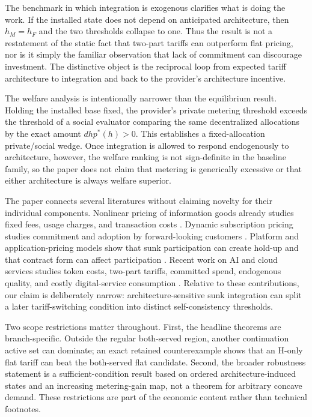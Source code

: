 The benchmark in which integration is exogenous clarifies what is doing the work. If the installed state does not depend on anticipated architecture, then $h_M=h_F$ and the two thresholds collapse to one. Thus the result is not a restatement of the static fact that two-part tariffs can outperform flat pricing, nor is it simply the familiar observation that lack of commitment can discourage investment. The distinctive object is the reciprocal loop from expected tariff architecture to integration and back to the provider's architecture incentive.

The welfare analysis is intentionally narrower than the equilibrium result. Holding the installed base fixed, the provider's private metering threshold exceeds the threshold of a social evaluator comparing the same decentralized allocations by the exact amount $d h p^*(h)>0$. This establishes a fixed-allocation private/social wedge. Once integration is allowed to respond endogenously to architecture, however, the welfare ranking is not sign-definite in the baseline family, so the paper does not claim that metering is generically excessive or that either architecture is always welfare superior.

The paper connects several literatures without claiming novelty for their individual components. Nonlinear pricing of information goods already studies fixed fees, usage charges, and transaction costs \citep{sundararajan2004}. Dynamic subscription pricing studies commitment and adoption by forward-looking customers \citep{penmetsa2015}. Platform and application-pricing models show that sunk participation can create hold-up and that contract form can affect participation \citep{gans2012,mutherswismer2022}. Recent work on AI and cloud services studies token costs, two-part tariffs, committed spend, endogenous quality, and costly digital-service consumption \citep{bergemannbonattismolin2025,bergemannwang2025,bhaskaran2026,bichuchyaish2026}. Relative to these contributions, our claim is deliberately narrow: architecture-sensitive sunk integration can split a later tariff-switching condition into distinct self-consistency thresholds.

Two scope restrictions matter throughout. First, the headline theorems are branch-specific. Outside the regular both-served region, another continuation active set can dominate; an exact retained counterexample shows that an H-only flat tariff can beat the both-served flat candidate. Second, the broader robustness statement is a sufficient-condition result based on ordered architecture-induced states and an increasing metering-gain map, not a theorem for arbitrary concave demand. These restrictions are part of the economic content rather than technical footnotes.

